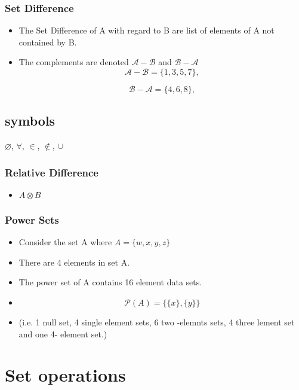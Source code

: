 \subsubsection*{Set Difference}
\begin{itemize}

\item The Set Difference of A with regard to B are list of elements of A not contained by B.

\item The complements are denoted $\mathcal{A-B}$ and $\mathcal{B-A}$
\[ \mathcal{A-B} = \{1,3,5,7\}, \]

\[ \mathcal{B-A} = \{4,6,8\}, \]
\end{itemize}
\subsection*{symbols}
$\varnothing$,
$\forall$,
$\in$,
$\notin$,
$\cup$
\newpage


\subsubsection*{Relative Difference}
\begin{itemize}
\item $ A \otimes B$
\end{itemize}
\subsubsection*{Power Sets}
\begin{itemize}
\item Consider the set A where $ A = \{w,x,y,z\}$
\item There are 4 elements in set A.
\item The power set of A contains 16 element data sets.
\item \[  \mathcal{P}(A) = \{\{ x \}, \{ y \} \}  \]
\item (i.e. 1 null set, 4 single element sets, 6 two -elemnts sets, 4 three lement set and one 4- element set.)
\end{itemize}





\section{Set operations}

